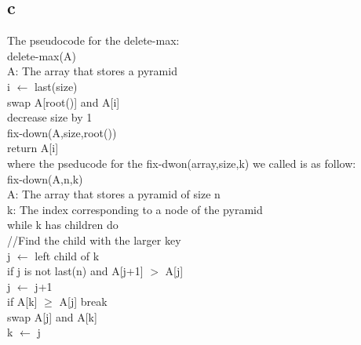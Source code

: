 \documentclass[12pt]{article}
\begin{document}
\begin{itemize}
		\part{c}
		The pseudocode for the delete-max:\\
		
		delete-max(A)\\
		A: The array that stores a pyramid\\
		i $\gets$ last(size)\\
		swap A[root()] and A[i]\\
		decrease size by 1\\
		fix-down(A,size,root())\\
		return A[i]\\
		
		where the pseducode for the fix-dwon(array,size,k) we called is as follow:\\
		
		fix-down(A,n,k)\\
		A: The array that stores a pyramid of size n\\
		k: The index corresponding to a node of the pyramid\\
		while k has children do\\
			\hphantom{1111} //Find the child with the larger key\\
			\hphantom{1111} j $\gets$ left child of k\\
			\hphantom{1111} if j is not last(n) and A[j+1] $>$ A[j]\\
			\hphantom{11111111} j $\gets$ j+1\\
			\hphantom{1111} if A[k] $\geq$ A[j]  break\\
			\hphantom{1111} swap A[j] and A[k]\\
			\hphantom{1111} k $\gets$ j\\
		

\end{itemize}
\end{document}
